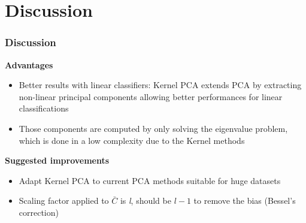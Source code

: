 
\section[Discussion]{Discussion} %

\begin{frame}
    \frametitle{Discussion} %
	\textbf{Advantages}
	\begin{itemize}
		\item Better results with linear classifiers: Kernel PCA extends PCA by extracting non-linear principal components allowing better performances for linear classifications
		\item Those components are computed by only solving the eigenvalue problem, which is done in a low complexity due to the Kernel methods
	\end{itemize}

	\textbf{Suggested improvements}
	\begin{itemize}
		\item Adapt Kernel PCA to current PCA methods suitable for huge datasets
		\item Scaling factor applied to $\bar{C}$ is \textit{l}, should be $l-1$ to remove the bias (Bessel's correction)
	\end{itemize}
\end{frame}

